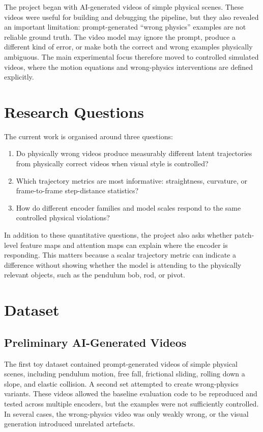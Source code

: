 \documentclass[final-report]{report-template}
\begin{document}
The project began with AI-generated videos of simple physical scenes. These
videos were useful for building and debugging the pipeline, but they also
revealed an important limitation: prompt-generated ``wrong physics'' examples
are not reliable ground truth. The video model may ignore the prompt, produce a
different kind of error, or make both the correct and wrong examples physically
ambiguous. The main experimental focus therefore moved to controlled simulated
videos, where the motion equations and wrong-physics interventions are defined
explicitly.

\section{Research Questions}
The current work is organised around three questions:

\begin{enumerate}
    \item Do physically wrong videos produce measurably different latent
    trajectories from physically correct videos when visual style is controlled?
    \item Which trajectory metrics are most informative: straightness,
    curvature, or frame-to-frame step-distance statistics?
    \item How do different encoder families and model scales respond to the
    same controlled physical violations?
\end{enumerate}

In addition to these quantitative questions, the project also asks whether
patch-level feature maps and attention maps can explain where the encoder is
responding. This matters because a scalar trajectory metric can indicate a
difference without showing whether the model is attending to the physically
relevant objects, such as the pendulum bob, rod, or pivot.

\section{Dataset}
\subsection{Preliminary AI-Generated Videos}
The first toy dataset contained prompt-generated videos of simple physical
scenes, including pendulum motion, free fall, frictional sliding, rolling down a
slope, and elastic collision. A second set attempted to create wrong-physics
variants. These videos allowed the baseline evaluation code to be reproduced
and tested across multiple encoders, but the examples were not sufficiently
controlled. In several cases, the wrong-physics video was only weakly wrong, or
the visual generation introduced unrelated artefacts.
\end{document}
